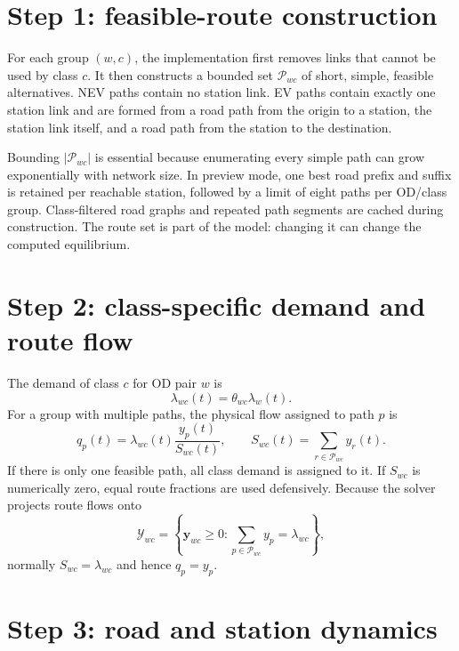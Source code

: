 \documentclass[11pt]{article}
\begin{document}
\section{Step 1: feasible-route construction}

For each group $(w,c)$, the implementation first removes links that cannot be
used by class $c$. It then constructs a bounded set $\mathcal{P}_{wc}$ of
short, simple, feasible alternatives. NEV paths contain no station link. EV
paths contain exactly one station link and are formed from a road path from the
origin to a station, the station link itself, and a road path from the station
to the destination.

Bounding $|\mathcal{P}_{wc}|$ is essential because enumerating every simple
path can grow exponentially with network size. In preview mode, one best road
prefix and suffix is retained per reachable station, followed by a limit of
eight paths per OD/class group. Class-filtered road graphs and repeated path
segments are cached during construction. The route set is part of the model:
changing it can change the computed equilibrium.

\section{Step 2: class-specific demand and route flow}

The demand of class $c$ for OD pair $w$ is
\begin{equation}
    \lambda_{wc}(t)=\theta_{wc}\lambda_w(t).
\end{equation}
For a group with multiple paths, the physical flow assigned to path $p$ is
\begin{equation}
    q_p(t)=\lambda_{wc}(t)\frac{y_p(t)}{S_{wc}(t)},
    \qquad
    S_{wc}(t)=\sum_{r\in\mathcal{P}_{wc}}y_r(t).
    \label{eq:path-flow}
\end{equation}
If there is only one feasible path, all class demand is assigned to it. If
$S_{wc}$ is numerically zero, equal route fractions are used defensively.
Because the solver projects route flows onto
\begin{equation}
    \mathcal{Y}_{wc}=
    \left\{\mathbf y_{wc}\geq 0:
    \sum_{p\in\mathcal{P}_{wc}}y_p=\lambda_{wc}\right\},
\end{equation}
normally $S_{wc}=\lambda_{wc}$ and hence $q_p=y_p$.

\section{Step 3: road and station dynamics}
\end{document}
